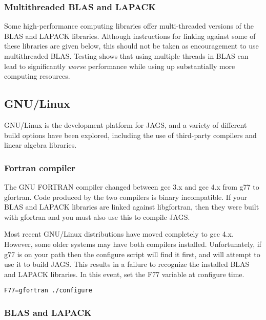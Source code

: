 \documentclass[11pt, a4paper, titlepage]{article}
\newcommand{\JAGS}{\textsf{JAGS}}
\newcommand{\code}[1]{{\bgroup{\normalfont\ttfamily #1}\egroup}}
\begin{document}
\subsubsection{Multithreaded BLAS and LAPACK}
\label{section:blas:multithreaded}

Some high-performance computing libraries offer multi-threaded
versions of the BLAS and LAPACK libraries. Although instructions for
linking against some of these libraries are given below, this should
not be taken as encouragement to use multithreaded BLAS.  Testing
shows that using multiple threads in BLAS can lead to significantly
{\em worse} performance while using up substantially more computing
resources.

\subsection{GNU/Linux}
\label{section:gnulinux}

GNU/Linux is the development platform for \JAGS, and a variety of
different build options have been explored, including the use of
third-party compilers and linear algebra libraries.

\subsubsection{Fortran compiler}

The GNU FORTRAN compiler changed between gcc 3.x and gcc 4.x from
\code{g77} to \code{gfortran}. Code produced by the two compilers is
binary incompatible. If your BLAS and LAPACK libraries are linked
against \code{libgfortran}, then they were built with \code{gfortran}
and you must also use this to compile \JAGS. 

Most recent GNU/Linux distributions have moved completely to gcc 4.x.
However, some older systems may have both compilers installed.
Unfortunately, if \code{g77} is on your path then the configure script
will find it first, and will attempt to use it to build \JAGS. This
results in a failure to recognize the installed BLAS and LAPACK
libraries. In this event, set the \code{F77} variable at configure time.
\begin{verbatim}
F77=gfortran ./configure
\end{verbatim}

\subsubsection{BLAS and LAPACK}
\end{document}
